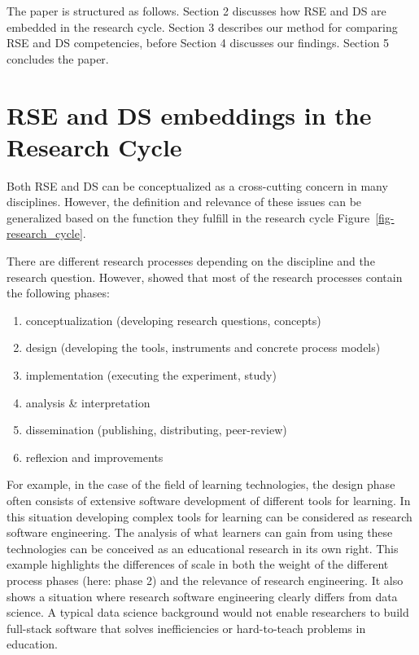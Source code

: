 \documentclass[
        english,biblatex
    ]{lni}
\providecommand{\tightlist}{%
    \setlength{\itemsep}{0pt}\setlength{\parskip}{0pt}}
\begin{document}
    The paper is structured as follows. Section 2 discusses how RSE and
    DS are embedded in the research cycle. Section 3 describes our
    method for comparing RSE and DS competencies, before Section 4
    discusses our findings. Section 5 concludes the paper.

    \section{RSE and DS embeddings in the Research
    Cycle}\label{rse-and-ds-embeddings-in-the-research-cycle}

    Both RSE and DS can be conceptualized as a cross-cutting concern in
    many disciplines. However, the definition and relevance of these
    issues can be generalized based on the function they fulfill in the
    research cycle Figure~\ref{fig-research_cycle}.

    There are different research processes depending on the discipline
    and the research question. However, \autocite{Dehne2021} showed that
    most of the research processes contain the following phases:

    \begin{enumerate}
    \def\labelenumi{\arabic{enumi}.}
    \tightlist
    \item
      conceptualization (developing research questions, concepts)
    \item
      design (developing the tools, instruments and concrete process
      models)
    \item
      implementation (executing the experiment, study)
    \item
      analysis \& interpretation
    \item
      dissemination (publishing, distributing, peer-review)
    \item
      reflexion and improvements
    \end{enumerate}

    For example, in the case of the field of learning technologies, the
    design phase often consists of extensive software development of
    different tools for learning. In this situation developing complex
    tools for learning can be considered as research software
    engineering. The analysis of what learners can gain from using these
    technologies can be conceived as an educational research in its own
    right. This example highlights the differences of scale in both the
    weight of the different process phases (here: phase 2) and the
    relevance of research engineering. It also shows a situation where
    research software engineering clearly differs from data science. A
    typical data science background would not enable researchers to
    build full-stack software that solves inefficiencies or
    hard-to-teach problems in education.
\end{document}
